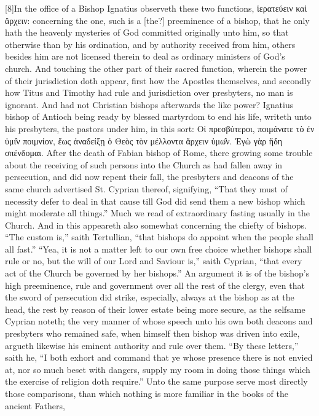 [8]In the office of a Bishop Ignatius observeth these two functions, ἱερατεύειν καὶ ἄρχειν: concerning the one, such is a [the?] preeminence of a bishop, that he only hath the heavenly mysteries of God committed originally unto him, so that otherwise than by his ordination, and by authority received from him, others besides him are not licensed therein to deal as ordinary ministers of God’s church. And touching the other part of their sacred function, wherein the power of their jurisdiction doth appear, first how the Apostles themselves, and secondly how Titus and Timothy had rule and jurisdiction over presbyters, no man is ignorant. And had not Christian bishops afterwards the like power? Ignatius bishop of Antioch being ready by blessed martyrdom to end his life, writeth unto his presbyters, the pastors under him, in this sort: Οἱ πρεσβύτεροι, ποιμάνατε τὸ ἐν ὑμι̑ν ποιμνίον, ἕως ἀναδείξῃ ὁ Θεὸς τὸν μέλλοντα ἄρχειν ὑμω̑ν. Ἐγὼ γὰρ ἤδη σπένδομαι. After the death of Fabian bishop of Rome, there growing some trouble about the receiving of such persons into the Church as had fallen away in persecution, and did now repent their fall, the presbyters and deacons of the same church advertised St. Cyprian thereof, signifying, “That they  must of necessity defer to deal in that cause till God did send them a new bishop which might moderate all things.” Much we read of extraordinary fasting usually in the Church. And in this appeareth also somewhat concerning the chiefty of bishops. “The custom is,” saith Tertullian, “that bishops do appoint when the people shall all fast.” “Yea, it is not a matter left to our own free choice whether bishops shall rule or no, but the will of our Lord and Saviour is,” saith Cyprian, “that every act of the Church be governed by her bishops.” An argument it is of the bishop’s high preeminence, rule and government over all the rest of the clergy, even that the sword of persecution did strike, especially, always at the bishop as at the head, the rest by reason of their lower estate being more secure, as the selfsame Cyprian noteth; the very manner of whose speech unto his own both deacons and presbyters who remained safe, when himself then bishop was driven into exile, argueth likewise his eminent authority and rule over them. “By these letters,” saith he, “I both exhort and command that ye whose presence there is not envied at, nor so much beset with dangers, supply my room in doing those things which the exercise of religion doth require.” Unto the same purpose serve most directly those comparisons, than which nothing is more familiar in the books  of the ancient Fathers,
